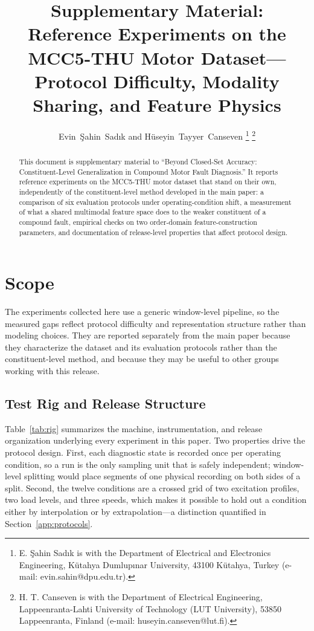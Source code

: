 \documentclass[journal]{IEEEtran}
\begin{document}
\title{Supplementary Material:\\
Reference Experiments on the MCC5-THU Motor Dataset---Protocol Difficulty,
Modality Sharing, and Feature Physics}
\author{Evin~\c{S}ahin~Sad{\i}k and H\"useyin~Tayyer~Canseven%
\thanks{E. \c{S}ahin Sad{\i}k is with the Department of Electrical and
Electronics Engineering, K\"utahya Dumlup{\i}nar University, 43100 K\"utahya,
Turkey (e-mail: evin.sahin@dpu.edu.tr).}%
\thanks{H. T. Canseven is with the Department of Electrical Engineering,
Lappeenranta-Lahti University of Technology (LUT University), 53850
Lappeenranta, Finland (e-mail: huseyin.canseven@lut.fi).}}
\maketitle

\begin{abstract}
This document is supplementary material to ``Beyond Closed-Set Accuracy:
Constituent-Level Generalization in Compound Motor Fault Diagnosis.'' It
reports reference experiments on the MCC5-THU motor dataset that stand on
their own, independently of the constituent-level method developed in the
main paper: a comparison of six evaluation protocols under
operating-condition shift, a measurement of what a shared multimodal feature
space does to the weaker constituent of a compound fault, empirical checks on
two order-domain feature-construction parameters, and documentation of
release-level properties that affect protocol design.
\end{abstract}

\section{Scope}

The experiments collected here use a generic window-level pipeline, so the
measured gaps reflect protocol difficulty and representation structure rather
than modeling choices. They are reported separately from the main paper
because they characterize the dataset and its evaluation protocols rather
than the constituent-level method, and because they may be useful to other
groups working with this release.

\subsection{Test Rig and Release Structure}
\label{app:rig}

Table~\ref{tab:rig} summarizes the machine, instrumentation, and release
organization underlying every experiment in this paper. Two properties drive
the protocol design. First, each diagnostic state is recorded once per
operating condition, so a run is the only sampling unit that is safely
independent; window-level splitting would place segments of one physical
recording on both sides of a split. Second, the twelve conditions are a
crossed grid of two excitation profiles, two load levels, and three speeds,
which makes it possible to hold out a condition either by interpolation or by
extrapolation---a distinction quantified in
Section~\ref{app:protocols}.
\end{document}

